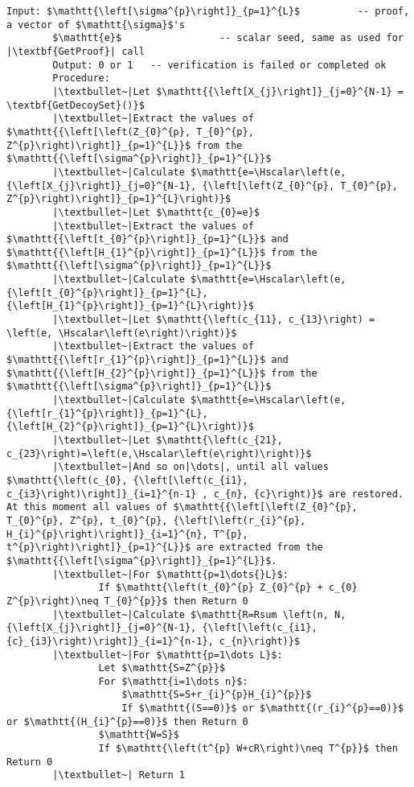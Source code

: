 \documentclass{mathcryptology} %
\newcommand{\Hscalar}{\textbf{H}_{\textbf{scalar}}}
\theoremstyle{title}
\theoremstyle{titleof}
\begin{document}
\begin{itemize}
        \begin{mdframed}[backgroundcolor=black!10!white]
        \begin{lstlisting}[caption={\textbf{mL2SHPoM.Verif} specification.},label={Lis:5}]
        Input: $\mathtt{\left[\sigma^{p}\right]}_{p=1}^{L}$          -- proof, a vector of $\mathtt{\sigma}$'s
        $\mathtt{e}$                 -- scalar seed, same as used for |\textbf{GetProof}| call
        Output: 0 or 1   -- verification is failed or completed ok
        Procedure:
        |\textbullet~|Let $\mathtt{{\left[X_{j}\right]}_{j=0}^{N-1} = \textbf{GetDecoySet}()}$
        |\textbullet~|Extract the values of $\mathtt{{\left[\left(Z_{0}^{p}, T_{0}^{p}, Z^{p}\right)\right]}_{p=1}^{L}}$ from the $\mathtt{{\left[\sigma^{p}\right]}_{p=1}^{L}}$
        |\textbullet~|Calculate $\mathtt{e=\Hscalar\left(e, {\left[X_{j}\right]}_{j=0}^{N-1}, {\left[\left(Z_{0}^{p}, T_{0}^{p}, Z^{p}\right)\right]}_{p=1}^{L}\right)}$
        |\textbullet~|Let $\mathtt{c_{0}=e}$
        |\textbullet~|Extract the values of $\mathtt{{\left[t_{0}^{p}\right]}_{p=1}^{L}}$ and $\mathtt{{\left[H_{1}^{p}\right]}_{p=1}^{L}}$ from the $\mathtt{{\left[\sigma^{p}\right]}_{p=1}^{L}}$
        |\textbullet~|Calculate $\mathtt{e=\Hscalar\left(e, {\left[t_{0}^{p}\right]}_{p=1}^{L}, {\left[H_{1}^{p}\right]}_{p=1}^{L}\right)}$
        |\textbullet~|Let $\mathtt{\left(c_{11}, c_{13}\right) = \left(e, \Hscalar\left(e\right)\right)}$
        |\textbullet~|Extract the values of $\mathtt{{\left[r_{1}^{p}\right]}_{p=1}^{L}}$ and $\mathtt{{\left[H_{2}^{p}\right]}_{p=1}^{L}}$ from the $\mathtt{{\left[\sigma^{p}\right]}_{p=1}^{L}}$
        |\textbullet~|Calculate $\mathtt{e=\Hscalar\left(e,{\left[r_{1}^{p}\right]}_{p=1}^{L}, {\left[H_{2}^{p}\right]}_{p=1}^{L}\right)}$
        |\textbullet~|Let $\mathtt{\left(c_{21}, c_{23}\right)=\left(e,\Hscalar\left(e\right)\right)}$
        |\textbullet~|And so on|\dots|, until all values $\mathtt{\left(c_{0}, {\left[\left(c_{i1}, c_{i3}\right)\right]}_{i=1}^{n-1} , c_{n}, {c}\right)}$ are restored. At this moment all values of $\mathtt{{\left[\left(Z_{0}^{p}, T_{0}^{p}, Z^{p}, t_{0}^{p}, {\left[\left(r_{i}^{p}, H_{i}^{p}\right)\right]}_{i=1}^{n}, T^{p}, t^{p}\right)\right]}_{p=1}^{L}}$ are extracted from the $\mathtt{{\left[\sigma^{p}\right]}_{p=1}^{L}}$.
        |\textbullet~|For $\mathtt{p=1\dots{}L}$:
                If $\mathtt{\left(t_{0}^{p} Z_{0}^{p} + c_{0} Z^{p}\right)\neq T_{0}^{p}}$ then Return 0
        |\textbullet~|Calculate $\mathtt{R=Rsum \left(n, N, {\left[X_{j}\right]}_{j=0}^{N-1}, {\left[\left(c_{i1}, {c}_{i3}\right)\right]}_{i=1}^{n-1}, c_{n}\right)}$
        |\textbullet~|For $\mathtt{p=1\dots L}$:
                Let $\mathtt{S=Z^{p}}$
                For $\mathtt{i=1\dots n}$:
                    $\mathtt{S=S+r_{i}^{p}H_{i}^{p}}$
                    If $\mathtt{(S==0)}$ or $\mathtt{(r_{i}^{p}==0)}$ or $\mathtt{(H_{i}^{p}==0)}$ then Return 0
                $\mathtt{W=S}$
                If $\mathtt{\left(t^{p} W+cR\right)\neq T^{p}}$ then Return 0
        |\textbullet~| Return 1
        \end{lstlisting}
        \end{mdframed}
    \end{itemize}
\end{document}
